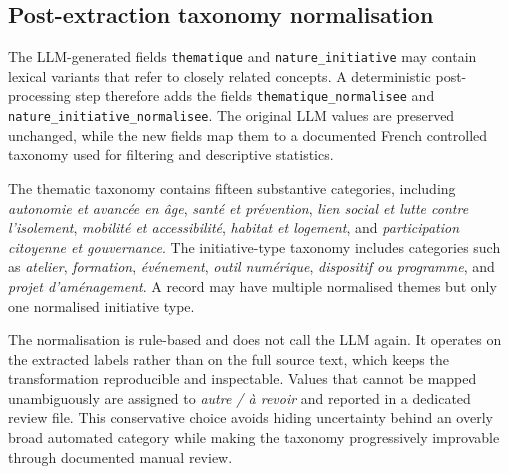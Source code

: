
\subsection{Post-extraction taxonomy normalisation}

The LLM-generated fields \texttt{thematique} and
\texttt{nature\_initiative} may contain lexical variants that refer to closely
related concepts. A deterministic post-processing step therefore adds the fields
\texttt{thematique\_normalisee} and
\texttt{nature\_initiative\_normalisee}. The original LLM values are preserved
unchanged, while the new fields map them to a documented French controlled
taxonomy used for filtering and descriptive statistics.

The thematic taxonomy contains fifteen substantive categories, including
\textit{autonomie et avancée en âge}, \textit{santé et prévention},
\textit{lien social et lutte contre l'isolement}, \textit{mobilité et
accessibilité}, \textit{habitat et logement}, and \textit{participation
citoyenne et gouvernance}. The initiative-type taxonomy includes categories such
as \textit{atelier}, \textit{formation}, \textit{événement}, \textit{outil
numérique}, \textit{dispositif ou programme}, and \textit{projet
d'aménagement}. A record may have multiple normalised themes but only one
normalised initiative type.

The normalisation is rule-based and does not call the LLM again. It operates on
the extracted labels rather than on the full source text, which keeps the
transformation reproducible and inspectable. Values that cannot be mapped
unambiguously are assigned to \textit{autre / à revoir} and reported in a
dedicated review file. This conservative choice avoids hiding uncertainty behind
an overly broad automated category while making the taxonomy progressively
improvable through documented manual review.
